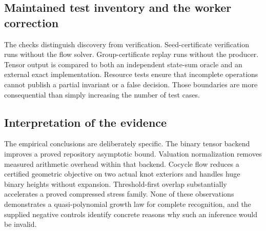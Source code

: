 \subsection{Maintained test inventory and the worker correction}



The checks distinguish discovery from verification. Seed-certificate
verification runs without the flow solver. Group-certificate replay runs
without the producer. Tensor output is compared to both an independent
state-sum oracle and an external exact implementation. Resource tests ensure
that incomplete operations cannot publish a partial invariant or a false
decision. Those boundaries are more consequential than simply increasing
the number of test cases.

\subsection{Interpretation of the evidence}

The empirical conclusions are deliberately specific. The binary tensor
backend improves a proved repository asymptotic bound. Valuation normalization
removes measured arithmetic overhead within that backend. Cocycle flow
reduces a certified geometric objective on two actual knot exteriors and
handles huge binary heights without expansion. Threshold-first overlap
substantially accelerates a proved compressed stress family. None of these
observations demonstrates a quasi-polynomial growth law for complete
recognition, and the supplied negative controls identify concrete reasons
why such an inference would be invalid.
